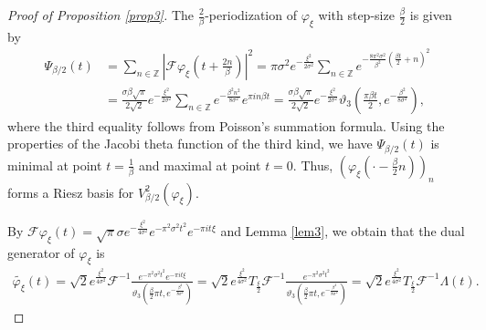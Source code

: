 \documentclass[11pt, reqno]{amsart}
\newcommand{\Z}{\mathbb{Z}}
\numberwithin{equation}{section}
\begin{document}
\begin{appendices}
\begin{proof}[Proof of Proposition \ref{prop3}]
	The $\frac{2}{\beta}$-periodization of $\varphi_\xi$ with step-size $\frac{\beta}{2}$ is given by
	\begin{align*}
		\Psi_{\beta/2}(t) {}& = \sum_{n\in \Z} |\mathcal{F} \varphi_\xi(t + \frac{2n}{\beta})|^2 = \pi \sigma^2 e^{-\frac{\xi^2}{2\sigma^2}} \sum_{n\in \Z} e^{-\frac{8\pi^2 \sigma^2}{\beta^2} (\frac{\beta t}{2} + n)^2} \\
		{}& = \frac{\sigma \beta \sqrt{\pi}}{2 \sqrt{2}} e^{-\frac{\xi^2}{2\sigma^2}} \sum_{n\in \Z} e^{-\frac{\beta^2 n^2}{8\sigma^2}} e^{\pi in \beta t} = \frac{\sigma \beta \sqrt{\pi}}{2\sqrt{2}} e^{-\frac{\xi^2}{2\sigma^2}} \vartheta_3(\frac{\pi \beta t}{2},e^{-\frac{\beta^2}{8\sigma^2}}),
	\end{align*}
        where the third equality follows from Poisson's summation formula. Using the properties of the Jacobi theta function of the third kind, we have $\Psi_{\beta/2}(t)$ is minimal at point $t = \frac{1}{\beta}$ and maximal at point $t = 0$. Thus, $(\varphi_\xi(\cdot - \frac{\beta}{2} n))_n$ forms a Riesz basis for $V_{\beta/2}^{2}(\varphi_\xi)$.

        By $\mathcal{F} \varphi_\xi (t) = \sqrt{\pi} \sigma e^{-\frac{\xi^2}{4 \sigma^2}} e^{- \pi^2 \sigma^2 t^2} e^{-\pi i t\xi}$ and Lemma \ref{lem3}, we obtain that the dual generator of $\varphi_\xi$ is
	\begin{align*}
		\widetilde{\varphi_\xi} (t) = \sqrt{2}e^{\frac{\xi^2}{4\sigma^2}} \mathcal{F}^{-1} \frac{e^{-\pi^2 \sigma^2 t^2} e^{-\pi i t\xi}}{\vartheta_3(\frac{\beta}{2}\pi t, e^{-\frac{\beta^2}{8\sigma^2}})}
        = \sqrt{2} e^{\frac{\xi^2}{4\sigma^2}} T_{\frac{\xi}{2}} \mathcal{F}^{-1} \frac{e^{-\pi^2 \sigma^2 t^2}}{\vartheta_3(\frac{\beta}{2}\pi t, e^{-\frac{\beta^2}{8\sigma^2}})} = \sqrt{2} e^{\frac{\xi^2}{4\sigma^2}} T_{\frac{\xi}{2}} \mathcal{F}^{-1} \Lambda(t).
	\end{align*}
    \end{proof}


\end{appendices}
\end{document}
